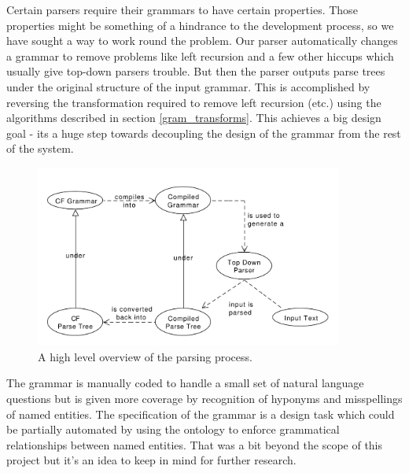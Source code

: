 \documentclass[11pt]{article}
\begin{document}
Certain parsers require their grammars to have certain properties. Those properties
might be something of a hindrance to the development process, so we have sought
a way to work round the problem. Our parser automatically changes a grammar
to remove problems like left recursion and a few other hiccups which usually 
give top-down parsers trouble. But then the parser outputs
parse trees under the original structure of the input grammar.
This is accomplished by reversing the transformation required to remove left
recursion (etc.) using the algorithms described in section \ref{gram_transforms}.
This achieves a big design goal - its a huge step towards decoupling the
design of the grammar from the rest of the system.

\begin{figure}[h!]
    \centering
    \includegraphics[width=0.9\textwidth,natwidth=1,natheight=1]{umlet/high_level.pdf}
    \caption{A high level overview of the parsing process.}
    \label{fig:high_level_parse}
\end{figure}

The grammar is manually coded to handle a small set of natural language questions
but is given more coverage by recognition of hyponyms and misspellings of named entities.
The specification of the grammar is a design task which could be partially automated by
using the ontology to enforce grammatical relationships between named entities. That
was a bit beyond the scope of this project but it's an idea to keep in mind for further
research.
\end{document}
